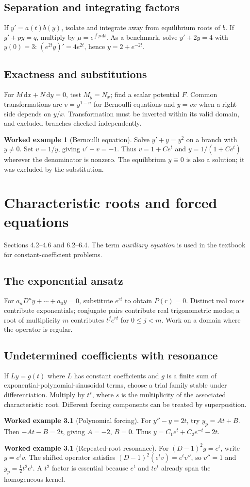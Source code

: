 \documentclass[11pt,letterpaper,oneside]{report}
\theoremstyle{definition}\newtheorem{definition}[theorem]{Definition}
\newtheorem{example}[theorem]{Worked example}
\theoremstyle{remark}\newtheorem{remark}[theorem]{Remark}
\newcommand{\dd}{\,\mathrm{d}}
\begin{document}
\section{Separation and integrating factors}
If $y'=a(t)b(y)$, isolate and integrate away from equilibrium roots of $b$. If $y'+p y=q$, multiply by $\mu=e^{\int p\dd t}$. As a benchmark, solve $y'+2y=4$ with $y(0)=3$: $(e^{2t}y)'=4e^{2t}$, hence $y=2+e^{-2t}$.
\section{Exactness and substitutions}
For $M\dd x+N\dd y=0$, test $M_y=N_x$; find a scalar potential $F$. Common transformations are $v=y^{1-n}$ for Bernoulli equations and $y=vx$ when a right side depends on $y/x$. Transformation must be inverted within its valid domain, and excluded branches checked independently.
\begin{example}[Bernoulli equation]
Solve $y'+y=y^2$ on a branch with $y\ne0$. Set $v=1/y$, giving $v'-v=-1$. Thus $v=1+Ce^t$ and $y=1/(1+Ce^t)$ wherever the denominator is nonzero. The equilibrium $y\equiv0$ is also a solution; it was excluded by the substitution.
\end{example}
\chapter{Characteristic roots and forced equations}
\begin{bookground}Sections 4.2--4.6 and 6.2--6.4. The term \emph{auxiliary equation} is used in the textbook for constant-coefficient problems.\end{bookground}
\section{The exponential ansatz}
For $a_n D^ny+\cdots+a_0y=0$, substitute $e^{rt}$ to obtain $P(r)=0$. Distinct real roots contribute exponentials; conjugate pairs contribute real trigonometric modes; a root of multiplicity $m$ contributes $t^j e^{rt}$ for $0\le j<m$. Work on a domain where the operator is regular.
\section{Undetermined coefficients with resonance}
If $Ly=g(t)$ where $L$ has constant coefficients and $g$ is a finite sum of exponential-polynomial-sinusoidal terms, choose a trial family stable under differentiation. Multiply by $t^s$, where $s$ is the multiplicity of the associated characteristic root. Different forcing components can be treated by superposition.
\begin{example}[Polynomial forcing]
For $y''-y=2t$, try $y_p=At+B$. Then $-At-B=2t$, giving $A=-2$, $B=0$. Thus $y=C_1e^t+C_2e^{-t}-2t$.
\end{example}
\begin{example}[Repeated-root resonance]
For $(D-1)^2 y=e^t$, write $y=e^t v$. The shifted operator satisfies $(D-1)^2(e^t v)=e^t v''$, so $v''=1$ and $y_p=\tfrac12t^2e^t$. A $t^2$ factor is essential because $e^t$ and $te^t$ already span the homogeneous kernel.
\end{example}
\end{document}
